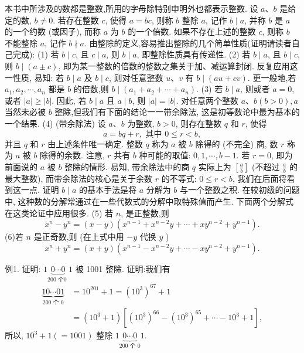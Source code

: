 
本书中所涉及的数都是整数,所用的字母除特别申明外也都表示整数.
设 $a 、 b$ 是给定的数, $b \neq 0$. 若存在整数 $c$, 使得 $a=b c$, 则称 $b$ 整除 $a$, 记作 $b \mid a$, 并称 $b$ 是 $a$ 的一个约数 (或因子), 而称 $a$ 为 $b$ 的一个倍数.
如果不存在上述的整数 $c$, 则称 $b$ 不能整除 $a$, 记作 $b \nmid a$.
由整除的定义,容易推出整除的几个简单性质(证明请读者自己完成):
(1) 若 $b \mid c$, 且 $c \mid a$, 则 $b \mid a$, 即整除性质具有传递性.
(2) 若 $b \mid a$, 且 $b \mid c$, 则 $b \mid(a \pm c)$, 即为某一整数的倍数的整数之集关于加、减运算封闭.
反复应用这一性质, 易知: 若 $b \mid a$ 及 $b \mid c$, 则对任意整数 $u 、 v$ 有 $b \mid(a u+ c v)$. 更一般地,若 $a_1, a_2, \cdots, a_n$ 都是 $b$ 的倍数,则 $b \mid\left(a_1+a_2+\cdots+a_n\right)$.
(3) 若 $b \mid a$, 则或者 $a=0$, 或者 $|a| \geqslant|b|$. 因此, 若 $b \mid a$ 且 $a \mid b$, 则 $|a|=|b|$.
对任意两个整数 $a 、 b(b>0), a$ 当然未必被 $b$ 整除,但我们有下面的结论一一带余除法, 这是初等数论中最为基本的一个结果.
(4) (带余除法) 设 $a 、 b$ 为整数, $b>0$, 则存在整数 $q$ 和 $r$, 使得
$$
a=b q+r, \text { 其中 } 0 \leqslant r<b,
$$
并且 $q$ 和 $r$ 由上述条件唯一确定.
整数 $q$ 称为 $a$ 被 $b$ 除得的 (不完全) 商, 数 $r$ 称为 $a$ 被 $b$ 除得的余数.
注意, $r$ 共有 $b$ 种可能的取值: $0,1, \cdots, b-1$. 若 $r=0$, 即为前面说的 $a$ 被 $b$ 整除的情形.
易知, 带余除法中的商 $q$ 实际上为 $\left[\frac{a}{b}\right]$ (不超过 $\frac{a}{b}$ 的最大整数), 而带余除法的核心是关于余数 $r$ 的不等式: $0 \leqslant r<b$, 我们在后面将看到这一点.
证明 $b \mid a$ 的基本手法是将 $a$ 分解为 $b$ 与一个整数之积.
在较初级的问题中, 这种数的分解常通过在一些代数式的分解中取特殊值而产生.
下面两个分解式在这类论证中应用很多.
(5) 若 $n$, 是正整数,则
$$
x^n-y^n=(x-y)\left(x^{n-1}+x^{n-2} y+\cdots+x y^{n-2}+y^{n-1}\right) .
$$
(6)若 $n$ 是正奇数,则 (在上式中用 $-y$ 代换 $y$ )
$$
x^n+y^n=(x+y)\left(x^{n-1}-x^{n-2} y+\cdots-x y^{n-2}+y^{n-1}\right) .
$$



例1. 证明: $1 \underbrace{0 \cdots 0}_{200 \text { 个0 }} 1$ 被 1001 整除.
证明:我们有
$$
\begin{aligned}
\underbrace{10 \cdots 01}_{200 \text { 个 } 0} & =10^{201}+1=\left(10^3\right)^{67}+1 \\
& =\left(10^3+1\right)\left[\left(10^3\right)^{66}-\left(10^3\right)^{65}+\cdots-10^3+1\right],
\end{aligned}
$$
所以, $10^3+1(=1001)$ 整除 $1 \underbrace{0 \cdots 0}_{200 \text { 个 } 0} 1$.



